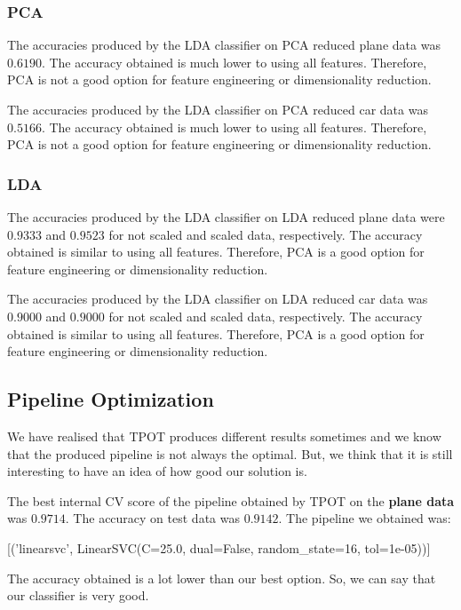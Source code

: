 \documentclass{article} %
\begin{document}
\subsubsection{PCA}

The accuracies produced by the LDA classifier on PCA reduced plane data was $0.6190$. The accuracy obtained is much lower to using all features. Therefore, PCA is not a good option for feature engineering or dimensionality reduction.

The accuracies produced by the LDA classifier on PCA reduced car data was $0.5166$. The accuracy obtained is much lower to using all features. Therefore, PCA is not a good option for feature engineering or dimensionality reduction.

\subsubsection{LDA}

The accuracies produced by the LDA classifier on LDA reduced plane data were $0.9333$ and $0.9523$ for not scaled and scaled data, respectively. The accuracy obtained is similar to using all features. Therefore, PCA is a good option for feature engineering or dimensionality reduction.

The accuracies produced by the LDA classifier on LDA reduced car data was $0.9000$ and $0.9000$ for not scaled and scaled data, respectively. The accuracy obtained is similar to using all features. Therefore, PCA is a good option for feature engineering or dimensionality reduction.

\subsection{Pipeline Optimization}

We have realised that TPOT produces different results sometimes and we know that the produced pipeline is not always the optimal. But, we think that it is still interesting to have an idea of how good our solution is.

The best internal CV score of the pipeline obtained by TPOT on the \textbf{plane data} was $0.9714$. The accuracy on test data was $0.9142$. The pipeline we obtained was: 

[('linearsvc', LinearSVC(C=25.0, dual=False, random\_state=16, tol=1e-05))]

The accuracy obtained is a lot lower than our best option. So, we can say that our classifier is very good.
\end{document}
